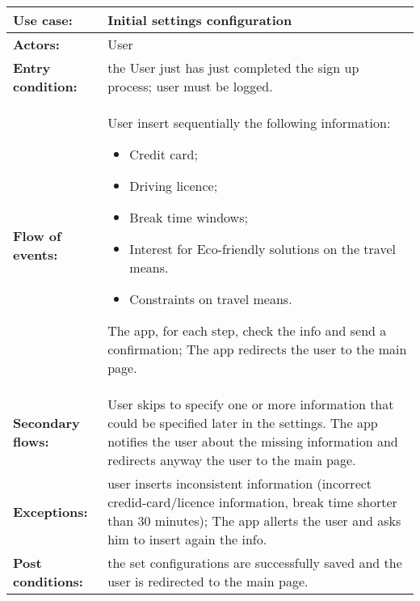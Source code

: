 		\begin{table}[h!]
			\begin{tabu} to \textwidth {| X[\fcWidth,r,p] | X[1-\fcWidth,l,p] |}
				\hline\textbf{Use case:} & Initial settings configuration
				\\
				\hline\textbf{Actors:} & User
				\\
				\hline\textbf{Entry condition:} & the User just has just completed the sign up process;\newline
				user must be logged.
				
				\\
				\hline\textbf{Flow of events:} & User insert sequentially the following  information:
				\begin{itemize}
				\item 	Credit card;
				\item 	Driving licence;
				\item 	Break time windows;
				\item	Interest for Eco-friendly solutions on the travel means.
				\item	Constraints on travel means.
				\end{itemize}
				The app, for each step,  check the info and send a confirmation;
				The app redirects the user to the main page.
				
				\\
				\hline\textbf{Secondary flows:} & User skips to specify one or more information that could be specified later in the settings.\newline
				The app notifies the user about the missing information and redirects anyway the user to the main page.
				
				\\
				\hline\textbf{Exceptions:} & user inserts inconsistent information (incorrect credid-card/licence information, break time shorter than 30 minutes);\newline
				The app allerts the user and asks him to insert again the info.
				\\
				\hline\textbf{Post conditions:} & the set configurations are successfully saved and the user is redirected to the main page.
				\\
				\hline
			\end{tabu}
		\end{table}
